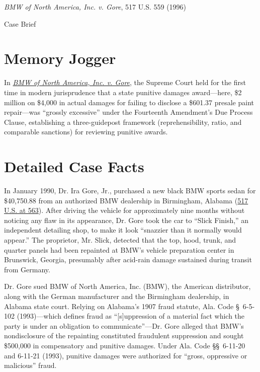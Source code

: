 \documentclass[12pt]{article}
\begin{document}
\begin{center}
{\LARGE \textit{BMW of North America, Inc. v. Gore}, 517 U.S. 559 (1996)\par}
\vspace{0.8em}
{\large Case Brief\par}
\end{center}
\vspace{1em}

\section{Memory Jogger}

In \href{https://www.courtlistener.com/opinion/118026/bmw-of-north-america-inc-v-gore/}{\textit{BMW of North America, Inc. v. Gore}}, the Supreme Court held for the first time in modern jurisprudence that a state punitive damages award---here, \$2 million on \$4,000 in actual damages for failing to disclose a \$601.37 presale paint repair---was ``grossly excessive'' under the Fourteenth Amendment's Due Process Clause, establishing a three-guidepost framework (reprehensibility, ratio, and comparable sanctions) for reviewing punitive awards.

\section{Detailed Case Facts}

In January 1990, Dr. Ira Gore, Jr., purchased a new black BMW sports sedan for \$40,750.88 from an authorized BMW dealership in Birmingham, Alabama (\href{https://supreme.justia.com/cases/federal/us/517/559/}{517 U.S. at 563}). After driving the vehicle for approximately nine months without noticing any flaw in its appearance, Dr. Gore took the car to ``Slick Finish,'' an independent detailing shop, to make it look ``snazzier than it normally would appear.'' The proprietor, Mr. Slick, detected that the top, hood, trunk, and quarter panels had been repainted at BMW's vehicle preparation center in Brunswick, Georgia, presumably after acid-rain damage sustained during transit from Germany.

Dr. Gore sued BMW of North America, Inc. (BMW), the American distributor, along with the German manufacturer and the Birmingham dealership, in Alabama state court. Relying on Alabama's 1907 fraud statute, Ala. Code \S~6-5-102 (1993)---which defines fraud as ``[s]uppression of a material fact which the party is under an obligation to communicate''---Dr. Gore alleged that BMW's nondisclosure of the repainting constituted fraudulent suppression and sought \$500,000 in compensatory and punitive damages. Under Ala. Code \S\S~6-11-20 and 6-11-21 (1993), punitive damages were authorized for ``gross, oppressive or malicious'' fraud.
\end{document}
